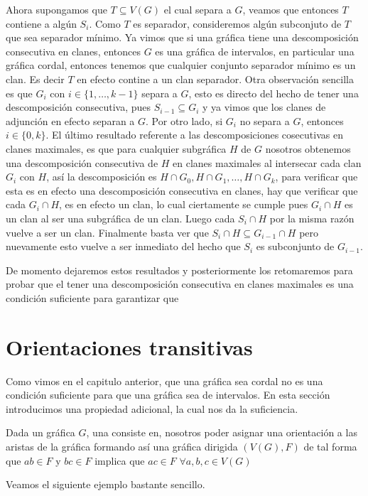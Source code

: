 Ahora supongamos que $T\subseteq V(G)$ el cual separa a $G$, veamos que entonces $T$ contiene a algún $S_i$. Como $T$ es separador, consideremos algún subconjuto de $T$ que sea separador mínimo. Ya vimos que si una gráfica tiene una descomposición consecutiva en clanes, entonces $G$ es una gráfica de intervalos, en particular una gráfica cordal, entonces tenemos que cualquier conjunto separador mínimo es un clan. Es decir $T$ en efecto contine a un clan separador. Otra observación sencilla es que $G_i $ con $i\in \{1,\dots, k-1\}$ separa a $G$, esto es directo del hecho de tener una descomposición consecutiva, pues $S_{i-1}\subseteq G_i$ y ya vimos que los clanes de adjunción en efecto separan a $G$. Por otro lado, si $G_i$ no separa a $G$, entonces $i\in \{0,k\}$. 
El último resultado referente a las descomposiciones cosecutivas en clanes maximales, es que para cualquier subgráfica $H$ de $G$ nosotros obtenemos una descomposición consecutiva de $H$ en clanes maximales al intersecar cada clan $G_i$ con $H$, así la descomposición es $H\cap G_0, H\cap G_1, \dots, H\cap G_k$, para verificar que esta es en efecto una descomposición consecutiva en clanes, hay que verificar que cada $G_i\cap H$, es en efecto un clan, lo cual ciertamente se cumple pues $G_i\cap H$ es un clan al ser una subgráfica de un clan. Luego cada $S_i\cap H$ por la misma razón vuelve a ser un clan. Finalmente basta ver que $S_i\cap H \subseteq G_{i-1} \cap H$ pero nuevamente esto vuelve a ser inmediato del hecho que $S_i$ es subconjunto de $G_{i-1}$. 

De momento dejaremos estos resultados y posteriormente los retomaremos para probar que el tener una descomposición consecutiva en clanes maximales es una condición suficiente para garantizar que 


\section{Orientaciones transitivas}
Como vimos en el capitulo anterior, que una gráfica sea cordal no es una
condición suficiente para que una gráfica sea de intervalos. En esta sección
introducimos una propiedad adicional, la cual nos da la suficiencia.

Dada un gráfica $G$, una  consiste en, nosotros
poder asignar una orientación a las aristas de la gráfica formando así una
gráfica dirigida $(V(G),F)$ de tal forma que $ab\in F$ y $bc\in F$ implica que
$ac\in F$ $\forall a,b,c \in V(G)$

Veamos el siguiente ejemplo bastante sencillo.

